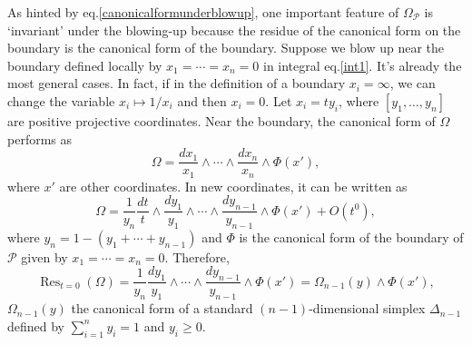 \documentclass[12pt]{article}
\theoremstyle{definition}
\theoremstyle{plain}
\begin{document}
As hinted by eq.\eqref{canonicalformunderblowup}, one important feature of $\Omega_{\mathcal P}$
is `invariant' under the blowing-up because the residue of the canonical form on the boundary is
the canonical form of the boundary.
Suppose we blow up near the boundary defined locally by $x_1=\cdots=x_n=0$ in integral eq.\eqref{int1}. 
It's already the most general cases. In fact, if in the definition of a boundary $x_i=\infty$, we can
change the variable $x_i\mapsto 1/x_i$ and then $x_i=0$.
Let $x_i=ty_i$, where $[y_1,\dots,y_n]$ are positive projective coordinates. 
Near the boundary, the canonical form of $\Omega$ performs as 
\[
	\Omega=\frac{dx_1}{x_1}\wedge \cdots\wedge\frac{dx_n}{x_n}
	\wedge \Phi(x'),
\]
where $x'$ are other coordinates. In new coordinates, it can be written as 
\[
	\Omega=\frac{1}{y_n}\frac{dt}{t}\wedge \frac{dy_1}{y_1}\wedge \cdots
	\wedge\frac{dy_{n-1}}{y_{n-1}}\wedge \Phi(x')+O(t^0),
\]
where $y_n=1-(y_1+\cdots+y_{n-1})$ and $\Phi$ is the canonical form of the boundary of $\mathcal P$ given by $x_1=\cdots=x_n=0$. Therefore,
\[
	\operatorname{Res}_{t=0}(\Omega)=\frac{1}{y_n}\frac{dy_1}{y_1}\wedge \cdots\wedge\frac{dy_{n-1}}{y_{n-1}}\wedge \Phi(x')=\Omega_{n-1}(y)\wedge \Phi(x'),
\]
$\Omega_{n-1}(y)$ the canonical form of a standard $(n-1)$-dimensional simplex $\Delta_{n-1}$ defined by
$
	\sum_{i=1}^n y_i=1
$ and $y_i\geq 0$. 



\end{document}
